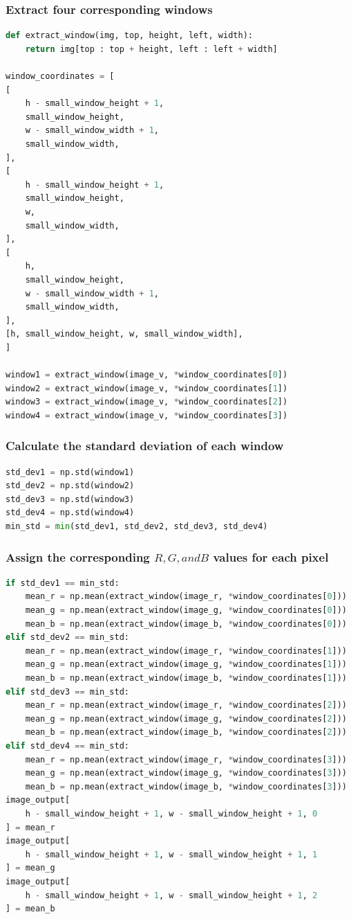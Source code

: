 \documentclass[12pt]{article}
\begin{document}
\subsubsection{Extract four corresponding windows}
\begin{lstlisting}[language=Python]
def extract_window(img, top, height, left, width):
    return img[top : top + height, left : left + width]
    
window_coordinates = [
[
    h - small_window_height + 1,
    small_window_height,
    w - small_window_width + 1,
    small_window_width,
],
[
    h - small_window_height + 1,
    small_window_height,
    w,
    small_window_width,
],
[
    h,
    small_window_height,
    w - small_window_width + 1,
    small_window_width,
],
[h, small_window_height, w, small_window_width],
]

window1 = extract_window(image_v, *window_coordinates[0])
window2 = extract_window(image_v, *window_coordinates[1])
window3 = extract_window(image_v, *window_coordinates[2])
window4 = extract_window(image_v, *window_coordinates[3])
\end{lstlisting}

\subsubsection{Calculate the standard deviation of each window}
\begin{lstlisting}[language=Python]
std_dev1 = np.std(window1)
std_dev2 = np.std(window2)
std_dev3 = np.std(window3)
std_dev4 = np.std(window4)
min_std = min(std_dev1, std_dev2, std_dev3, std_dev4)
\end{lstlisting}

\subsubsection{Assign the corresponding $R, G, and B$ values for each pixel}
\begin{lstlisting}[language=Python]
if std_dev1 == min_std:
    mean_r = np.mean(extract_window(image_r, *window_coordinates[0]))
    mean_g = np.mean(extract_window(image_g, *window_coordinates[0]))
    mean_b = np.mean(extract_window(image_b, *window_coordinates[0]))
elif std_dev2 == min_std:
    mean_r = np.mean(extract_window(image_r, *window_coordinates[1]))
    mean_g = np.mean(extract_window(image_g, *window_coordinates[1]))
    mean_b = np.mean(extract_window(image_b, *window_coordinates[1]))
elif std_dev3 == min_std:
    mean_r = np.mean(extract_window(image_r, *window_coordinates[2]))
    mean_g = np.mean(extract_window(image_g, *window_coordinates[2]))
    mean_b = np.mean(extract_window(image_b, *window_coordinates[2]))
elif std_dev4 == min_std:
    mean_r = np.mean(extract_window(image_r, *window_coordinates[3]))
    mean_g = np.mean(extract_window(image_g, *window_coordinates[3]))
    mean_b = np.mean(extract_window(image_b, *window_coordinates[3]))
image_output[
    h - small_window_height + 1, w - small_window_height + 1, 0
] = mean_r
image_output[
    h - small_window_height + 1, w - small_window_height + 1, 1
] = mean_g
image_output[
    h - small_window_height + 1, w - small_window_height + 1, 2
] = mean_b
\end{lstlisting}
\end{document}
